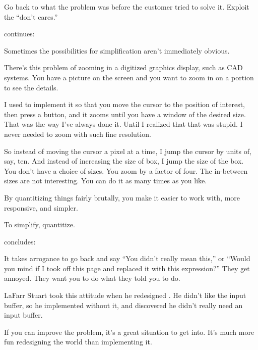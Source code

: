 \begin{tip}
Go back to what the problem was before the customer tried to solve it.
Exploit the ``don't cares.''
\end{tip}




\begin{interview}
 continues:

\begin{tfquot}
Sometimes the possibilities for simplification aren't immediately
obvious.

There's this problem of zooming in a digitized graphics display, such
as CAD systems. You have a picture on the screen and you want to zoom
in on a portion to see the details.

I used to implement it so that you move the cursor to the position of
interest, then press a button, and it zooms until you have a window of
the desired size. That was the way I've always done it. Until I
realized that that was stupid. I never needed to zoom with such fine
resolution.

So instead of moving the cursor a pixel at a time, I jump the cursor
by units of, say, ten. And instead of increasing the size of box, I
jump the size of the box. You don't have a choice of sizes. You zoom
by a factor of four. The in-between sizes are not interesting. You can
do it as many times as you like.

By quantitizing things fairly brutally, you make it easier to work with,
more responsive, and simpler.
\end{tfquot}
\end{interview}

\begin{tip}
To simplify, quantitize.
\end{tip}

\begin{interview}
 concludes:
\begin{tfquot}
It takes arrogance to go back and say ``You didn't really mean this,''
or ``Would you mind if I took off this page and replaced it with this
expression?'' They get annoyed. They want you to do what they told you
to do.

LaFarr Stuart took this attitude when he redesigned \Forth{}
\cite{stuart80}. He didn't like the input buffer, so he implemented
\Forth{} without it, and discovered he didn't really need an input buffer.%

If you can improve the problem, it's a great situation to get into.
It's much more fun redesigning the world than implementing it.
\end{tfquot}
\end{interview}


